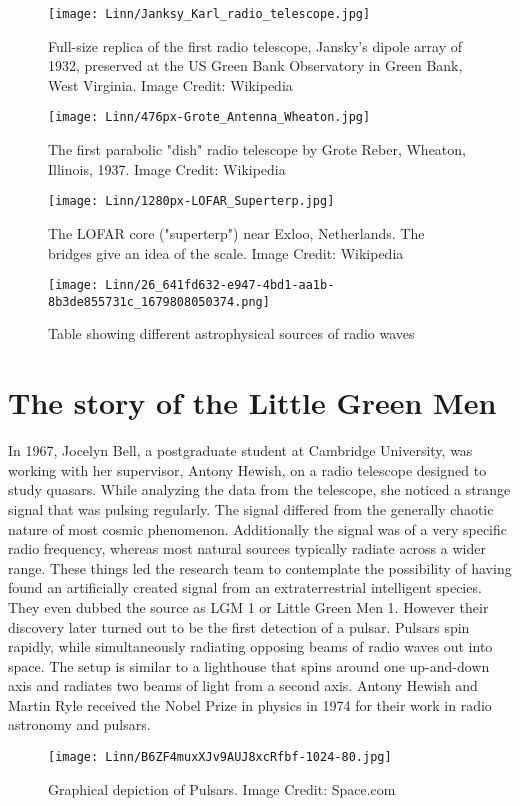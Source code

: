 \documentclass{../template/texnote}
\begin{document}
\begin{figure}
    \centering
    \texttt{[image: Linn/Janksy\_Karl\_radio\_telescope.jpg]}
    \caption{Full-size replica of the first radio telescope, Jansky's dipole array of 1932, preserved at the US Green Bank Observatory in Green Bank, West Virginia. Image Credit: Wikipedia}
    \label{fig:jansky}
\end{figure}

\begin{figure}
    \centering
    \texttt{[image: Linn/476px-Grote\_Antenna\_Wheaton.jpg]}
    \caption{The first parabolic "dish" radio telescope by Grote Reber, Wheaton, Illinois, 1937. Image Credit: Wikipedia}
    \label{fig:reber}
\end{figure}

\begin{figure}
    \centering
    \texttt{[image: Linn/1280px-LOFAR\_Superterp.jpg]}
    \caption{The LOFAR core ("superterp") near Exloo, Netherlands. The bridges give an idea of the scale. Image Credit: Wikipedia}
    \label{fig:radio_lofar}
\end{figure}

\begin{figure}
    \centering
    \texttt{[image: Linn/26\_641fd632-e947-4bd1-aa1b-8b3de855731c\_1679808050374.png]}
    \caption{Table showing different astrophysical sources of radio waves}
    \label{fig:radio_table}
\end{figure}

\section{The story of the Little Green Men}
In 1967, Jocelyn Bell, a postgraduate student at Cambridge University, was working with her supervisor, Antony Hewish, on a radio telescope designed to study quasars. While analyzing the data from the telescope, she noticed a strange signal that was pulsing regularly. The signal differed from the generally chaotic nature of most cosmic phenomenon. Additionally the signal was of a very specific radio frequency, whereas most natural sources typically radiate across a wider range. These things led the research team to contemplate the possibility of having found an artificially created signal from an extraterrestrial intelligent species. They even dubbed the source as LGM 1 or Little Green Men 1. However their discovery later turned out to be the first detection of a pulsar. Pulsars spin rapidly, while simultaneously radiating opposing beams of radio waves out into space. The setup is similar to a lighthouse that spins around one up-and-down axis and radiates two beams of light from a second axis. Antony Hewish and Martin Ryle received the Nobel Prize in physics in 1974 for their work in radio astronomy and pulsars.
\begin{figure}
    \centering
    \texttt{[image: Linn/B6ZF4muxXJv9AUJ8xcRfbf-1024-80.jpg]}
    \caption{Graphical depiction of Pulsars. Image Credit: Space.com}
    \label{fig:pulsars}
\end{figure}
\end{document}
